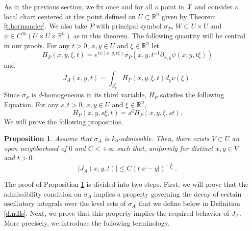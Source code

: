 \documentclass[10pt,twoside]{article}
\newcommand{\R}{\mathbb{R}}
\newcommand{\man}{\mathcal{X}}
\numberwithin{theorem}{section}
\newtheorem{proposition}[theorem]{Proposition}
\begin{document}
As in the previous section, we fix once and for all a point in $\man$ and consider a local chart centered at this point defined on $U\subset\R^n$ given by Theorem \ref{t.hormander}. We also take $P$ with principal symbol $\sigma_P$, $W\subset U\times U$ and $\psi\in C^\infty(U\times U\times\R^n)$ as in this theorem. The following quantity will be central in our proofs. For any $t>0$, $x,y\in U$ and $\xi\in\R^n$ let
\begin{equation}\label{e.amplitude}
H_P(x,y,\xi,t)=e^{i\psi(x,y,t\xi)}\sigma_P\left(x,y,t^{-1}\partial_{x,y}\psi(x,y,t\xi)\right)
\end{equation}
and
\begin{equation}\label{e.osc}
  J_A(x,y,t)=\int_{S^*_y}H_P(x,y,\xi,t)d_y\nu(\xi).
\end{equation}
Since $\sigma_P$ is $d$-homogeneous in its third variable, $H_P$ satisfies the following Equation. For any $s,t>0$, $x,y\in U$ and $\xi\in\R^n$,
\begin{equation}\label{e.scaling}
H_P(x,y,s\xi,t)=s^dH_P(x,y,\xi,st).
\end{equation}
We will prove the following proposition.

\begin{proposition}\label{p.jprop}
Assume that $\sigma_A$ is $k_0$-admissible. Then, there exists $V\subset U$ an open neighborhood of $0$ and $C<+\infty$ such that, uniformly for distinct $x,y\in V$ and $t>0$
\[
|J_A(x,y,t)|\leq C\left(t|x-y|\right)^{-\frac{1}{k_0}}\, .
\]
\end{proposition}

The proof of Proposition \ref{p.jprop} is divided into two steps. First, we will prove that the admissibility condition on $\sigma_A$ implies a property governing the decay of certain oscillatory integrals over the level sets of $\sigma_A$ that we define below in Definition \ref{d.ndls}. Next, we prove that this property implies the required behavior of $J_A$. More precisely, we introduce the following terminology.
\end{document}
